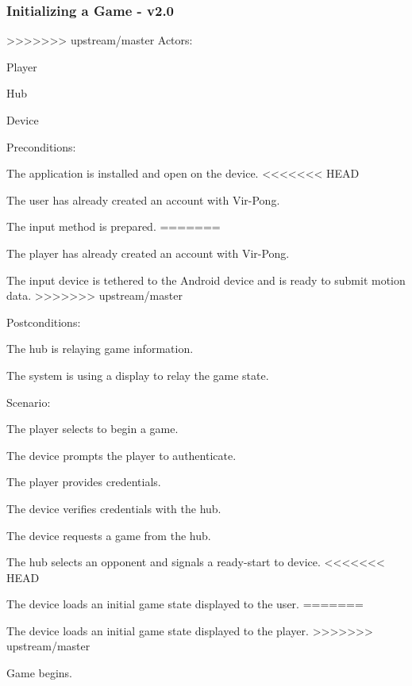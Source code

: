 \documentclass[12pt]{article}
\newenvironment{itemize*}%
  {\begin{itemize}%
  	\setlength{\parsep}{0pt}
    \setlength{\itemsep}{0pt}%
    \setlength{\parskip}{0pt}}%
  {\end{itemize}}
\newenvironment{enumerate*}%
  {\begin{enumerate}%
  	\setlength{\parsep}{0pt}
    \setlength{\itemsep}{0pt}%
    \setlength{\parskip}{0pt}}%
  {\end{enumerate}}
\begin{document}
\begin{itemize*}
\subsubsection*{Initializing a Game - v2.0}
>>>>>>> upstream/master
Actors:
\begin{itemize*}
\item Player
\item Hub
\item Device
\end{itemize*}
Preconditions:
\begin{itemize*}
\item The application is installed and open on the device.
<<<<<<< HEAD
\item The user has already created an account with Vir-Pong.
\item The input method is prepared.
=======
\item The player has already created an account with Vir-Pong.
\item The input device is tethered to the Android device and is ready to submit motion data.
>>>>>>> upstream/master
\end{itemize*}
Postconditions:
\begin{itemize*}
\item The hub is relaying game information.
\item The system is using a display to relay the game state.
\end{itemize*}
Scenario:
\begin{enumerate*}
\item \label{SelectStart}The player selects to begin a game.
\item \label{SystemPromptsAuthentication}The device prompts the player to authenticate.
\item \label{PlayerProvidesCredentials}The player provides credentials.
\item \label{SystemVerifies}The device verifies credentials with the hub.
\item \label{SystemRequestsGame}The device requests a game from the hub.
\item \label{HubSelectsOpponent}The hub selects an opponent and signals a ready-start to device.
<<<<<<< HEAD
\item \label{LoadGameState}The device loads an initial game state displayed to the user.
=======
\item \label{LoadGameState}The device loads an initial game state displayed to the player.
>>>>>>> upstream/master
\item Game begins.

\end{enumerate*}
\end{itemize*}
\end{document}

